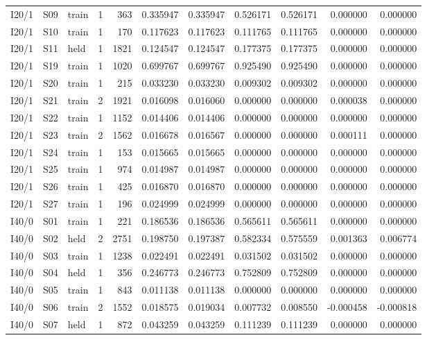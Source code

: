 \documentclass[10pt,a4paper]{article}
\begin{document}
{{\begin{longtable}{@{}lllrrrrrrrr@{}}
I20/1 & S09 & train & 1 & 363 & 0.335947 & 0.335947 & 0.526171 & 0.526171 & 0.000000 & 0.000000 \\
I20/1 & S10 & train & 1 & 170 & 0.117623 & 0.117623 & 0.111765 & 0.111765 & 0.000000 & 0.000000 \\
I20/1 & S11 & held & 1 & 1821 & 0.124547 & 0.124547 & 0.177375 & 0.177375 & 0.000000 & 0.000000 \\
I20/1 & S19 & train & 1 & 1020 & 0.699767 & 0.699767 & 0.925490 & 0.925490 & 0.000000 & 0.000000 \\
I20/1 & S20 & train & 1 & 215 & 0.033230 & 0.033230 & 0.009302 & 0.009302 & 0.000000 & 0.000000 \\
I20/1 & S21 & train & 2 & 1921 & 0.016098 & 0.016060 & 0.000000 & 0.000000 & 0.000038 & 0.000000 \\
I20/1 & S22 & train & 1 & 1152 & 0.014406 & 0.014406 & 0.000000 & 0.000000 & 0.000000 & 0.000000 \\
I20/1 & S23 & train & 2 & 1562 & 0.016678 & 0.016567 & 0.000000 & 0.000000 & 0.000111 & 0.000000 \\
I20/1 & S24 & train & 1 & 153 & 0.015665 & 0.015665 & 0.000000 & 0.000000 & 0.000000 & 0.000000 \\
I20/1 & S25 & train & 1 & 974 & 0.014987 & 0.014987 & 0.000000 & 0.000000 & 0.000000 & 0.000000 \\
I20/1 & S26 & train & 1 & 425 & 0.016870 & 0.016870 & 0.000000 & 0.000000 & 0.000000 & 0.000000 \\
I20/1 & S27 & train & 1 & 196 & 0.024999 & 0.024999 & 0.000000 & 0.000000 & 0.000000 & 0.000000 \\
I40/0 & S01 & train & 1 & 221 & 0.186536 & 0.186536 & 0.565611 & 0.565611 & 0.000000 & 0.000000 \\
I40/0 & S02 & held & 2 & 2751 & 0.198750 & 0.197387 & 0.582334 & 0.575559 & 0.001363 & 0.006774 \\
I40/0 & S03 & train & 1 & 1238 & 0.022491 & 0.022491 & 0.031502 & 0.031502 & 0.000000 & 0.000000 \\
I40/0 & S04 & held & 1 & 356 & 0.246773 & 0.246773 & 0.752809 & 0.752809 & 0.000000 & 0.000000 \\
I40/0 & S05 & train & 1 & 843 & 0.011138 & 0.011138 & 0.000000 & 0.000000 & 0.000000 & 0.000000 \\
I40/0 & S06 & train & 2 & 1552 & 0.018575 & 0.019034 & 0.007732 & 0.008550 & -0.000458 & -0.000818 \\
I40/0 & S07 & held & 1 & 872 & 0.043259 & 0.043259 & 0.111239 & 0.111239 & 0.000000 & 0.000000 \\

\end{longtable}}}
\end{document}
